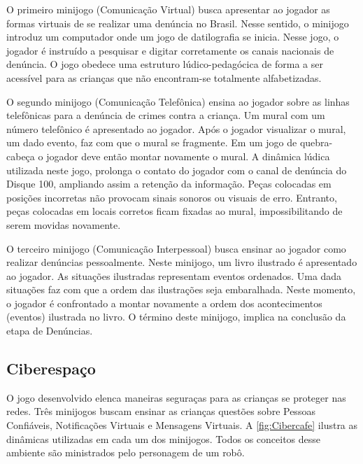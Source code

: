 O primeiro minijogo (Comunicação Virtual) busca apresentar ao jogador as formas virtuais de se realizar uma denúncia no Brasil. Nesse sentido, o minijogo introduz um computador onde um jogo de datilografia se inicia. Nesse jogo, o jogador é instruído a pesquisar e digitar corretamente os canais nacionais de denúncia. O jogo obedece uma estruturo lúdico-pedagócica de forma a ser acessível para as crianças que não encontram-se totalmente alfabetizadas. 

O segundo minijogo (Comunicação Telefônica) ensina ao jogador sobre as linhas telefônicas para a denúncia de crimes contra a criança. Um mural com um número telefônico é apresentado ao jogador. Após o jogador visualizar o mural, um dado evento, faz com que o mural se fragmente. Em um jogo de quebra-cabeça o jogador deve então montar novamente o mural. A dinâmica lúdica utilizada neste jogo, prolonga o contato do jogador com o canal de denúncia do Disque 100, ampliando assim a retenção da informação. Peças colocadas em posições incorretas não provocam sinais sonoros ou visuais de erro. Entranto, peças colocadas em locais corretos ficam fixadas ao mural, impossibilitando de serem movidas novamente. 

O terceiro minijogo (Comunicação Interpessoal) busca ensinar ao jogador como realizar denúncias pessoalmente. Neste minijogo, um livro ilustrado é apresentado ao jogador. As situações ilustradas representam eventos ordenados. Uma dada situações faz com que a ordem das ilustrações seja embaralhada. Neste momento, o jogador é confrontado a montar novamente a ordem dos acontecimentos (eventos) ilustrada no livro. 
O término deste minijogo, implica na conclusão da etapa de Denúncias. 

\subsection{Ciberespaço}\label{subsec:4}

O jogo desenvolvido elenca maneiras seguraças para as crianças se proteger nas redes. Três minijogos buscam ensinar as crianças questões sobre Pessoas Confiáveis, Notificações Virtuais e Mensagens Virtuais. A \autoref{fig:Cibercafe} ilustra as dinâmicas utilizadas em cada um dos minijogos. Todos os conceitos desse ambiente são ministrados pelo personagem de um robô. 


